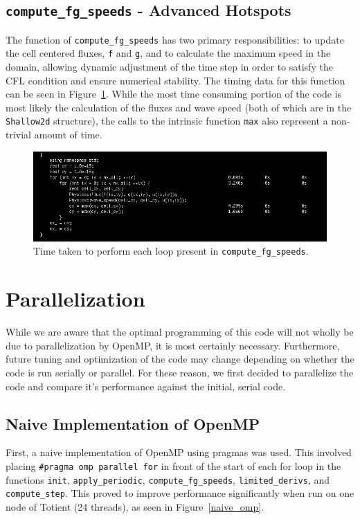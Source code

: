 \documentclass[12pt]{article}
\begin{document}
		\subsection{\texttt{compute\_fg\_speeds} - Advanced Hotspots}
		The function of \texttt{compute\_fg\_speeds} has two primary responsibilities: to update the cell centered fluxes, \texttt{f} and \texttt{g}, and to calculate the maximum speed in the domain, allowing dynamic adjustment of the time step in order to satisfy the CFL condition and ensure numerical stability. The timing data for this function can be seen in Figure~\ref{init_compute_fg_speeds}. While the most time consuming portion of the code is most likely the calculation of the fluxes and wave speed (both of which are in the \texttt{Shallow2d} structure), the calls to the intrinsic function \texttt{max} also represent a non-trivial amount of time. 	
		\begin{figure}[h]
			\begin{center}
				\includegraphics[width=0.7\columnwidth]{init_compute_fg_speeds}
				\caption{Time taken to perform each loop present in \texttt{compute\_fg\_speeds}.}
				\label{init_compute_fg_speeds}
			\end{center}
		\end{figure}	
		
	\section{Parallelization}
	While we are aware that the optimal programming of this code will not wholly be due to parallelization by OpenMP, it is most certainly necessary. Furthermore, future tuning and optimization of the code may change depending on whether the code is run serially or parallel. For these reason, we first decided to parallelize the code and compare it's performance against the initial, serial code.
		\subsection{Naive Implementation of OpenMP}
		First, a naive implementation of OpenMP using pragmas was used. This involved placing \texttt{#pragma omp parallel for} in front of the start of each for loop in the functions \texttt{init}, \texttt{apply\_periodic}, \texttt{compute\_fg\_speeds}, \texttt{limited\_derivs}, and \texttt{compute\_step}. This proved to improve performance significantly when run on one node of Totient (24 threads), as seen in Figure~\ref{naive_omp}. 
		
\end{document}
